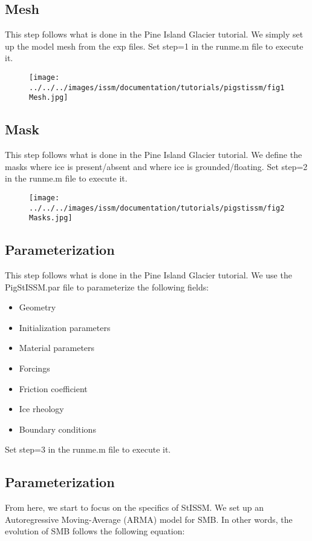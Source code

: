 \subsection{Mesh}%
This step follows what is done in the Pine Island Glacier tutorial. We simply set up the model mesh from the exp files. Set step=1 in the runme.m file to execute it.
\begin{figure}
	\begin{center}
		\texttt{[image: ../../../images/issm/documentation/tutorials/pigstissm/fig1Mesh.jpg]}
	\end{center}
\end{figure}

\subsection{Mask}%
This step follows what is done in the Pine Island Glacier tutorial. We define the masks where ice is present/absent and where ice is grounded/floating. Set step=2 in the runme.m file to execute it.
\begin{figure}
	\begin{center}
		\texttt{[image: ../../../images/issm/documentation/tutorials/pigstissm/fig2Masks.jpg]}
	\end{center}
\end{figure}

\subsection{Parameterization}%
This step follows what is done in the Pine Island Glacier tutorial. We use the PigStISSM.par file to parameterize the following fields:
\begin{itemize}
	\item Geometry
	\item Initialization parameters
	\item Material parameters
	\item Forcings
	\item Friction coefficient
	\item Ice rheology
	\item Boundary conditions
\end{itemize}
Set step=3 in the runme.m file to execute it.

\subsection{Parameterization}%
From here, we start to focus on the specifics of StISSM. We set up an Autoregressive Moving-Average (ARMA) model for SMB. In other words, the evolution of SMB follows the following equation:

